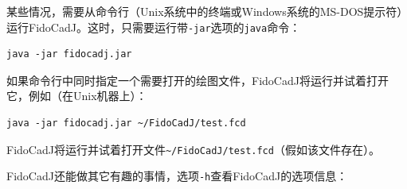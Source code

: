 \documentclass[10pt,a4paper,twoside]{scrreprt}
\begin{document}
某些情况，需要从命令行（Unix系统中的终端或Windows系统的MS-DOS提示符）运行FidoCadJ。这时，只需要运行带\lstinline!-jar!选项的\lstinline!java!命令：

\begin{lstlisting} 
java -jar fidocadj.jar
\end{lstlisting}

如果命令行中同时指定一个需要打开的绘图文件，FidoCadJ将运行并试着打开它，例如（在Unix机器上）：

\begin{lstlisting} 
java -jar fidocadj.jar ~/FidoCadJ/test.fcd 
\end{lstlisting}

FidoCadJ将运行并试着打开文件\lstinline!~/FidoCadJ/test.fcd!（假如该文件存在）。

FidoCadJ还能做其它有趣的事情，选项\lstinline!-h!查看FidoCadJ的选项信息：
\lstset{basicstyle=\scriptsize\ttfamily}
	 	 
\end{document}
